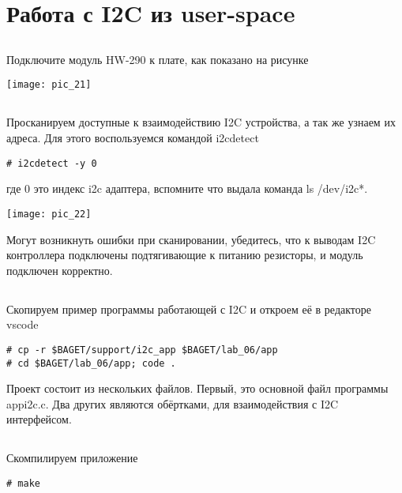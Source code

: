 \section{Работа с I2C из user-space}

\subsection{}Подключите модуль HW-290 к плате, как показано на рисунке 
\begin{center}
	\texttt{[image: pic\_21]}
\end{center}

\subsection{}Просканируем доступные к взаимодействию I2C устройства, а так же узнаем их адреса. Для этого воспользуемся командой i2cdetect
\begin{lstlisting}[style=bash]
# i2cdetect -y 0
\end{lstlisting}
где 0 это индекс i2c адаптера, вспомните что выдала команда ls /dev/i2c*.

\begin{center}
	\texttt{[image: pic\_22]}
\end{center}

Могут возникнуть ошибки при сканировании, убедитесь, что к выводам I2C контроллера подключены подтягивающие к питанию резисторы, и модуль подключен корректно.


\subsection{}Скопируем пример программы работающей с I2C и откроем её в редакторе vscode
\begin{lstlisting}[style=bash]
# cp -r $BAGET/support/i2c_app $BAGET/lab_06/app
# cd $BAGET/lab_06/app; code .
\end{lstlisting}

Проект состоит из нескольких файлов. Первый, это основной файл программы appi2c.c. Два других являются обёртками, для взаимодействия с I2C интерфейсом.

\subsection{}Скомпилируем приложение
\begin{lstlisting}[style=bash]
# make
\end{lstlisting}

